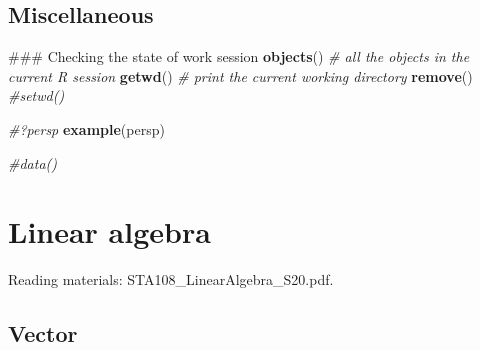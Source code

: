 \documentclass[12pt,]{book}
\newenvironment{Shaded}{\begin{snugshade}}{\end{snugshade}}
\newcommand{\KeywordTok}[1]{\textcolor[rgb]{0.13,0.29,0.53}{\textbf{#1}}}
\newcommand{\CommentTok}[1]{\textcolor[rgb]{0.56,0.35,0.01}{\textit{#1}}}
\newcommand{\NormalTok}[1]{#1}
\begin{document}
\section{Miscellaneous}\label{miscellaneous}

\begin{Shaded}
\begin{Highlighting}[]
\NormalTok{### Checking the state of work session}
\KeywordTok{objects}\NormalTok{()  }\CommentTok{# all the objects in the current R session}
\KeywordTok{getwd}\NormalTok{()  }\CommentTok{# print the current working directory}
\KeywordTok{remove}\NormalTok{()}
\CommentTok{#setwd()}

\CommentTok{#?persp}
\KeywordTok{example}\NormalTok{(persp)}
\end{Highlighting}
\end{Shaded}

\begin{Shaded}
\begin{Highlighting}[]
\CommentTok{#data()}
\end{Highlighting}
\end{Shaded}

\chapter{Linear algebra}\label{ch:algebra}

Reading materials: STA108\_LinearAlgebra\_S20.pdf.

\section{Vector}\label{vector}
\end{document}

